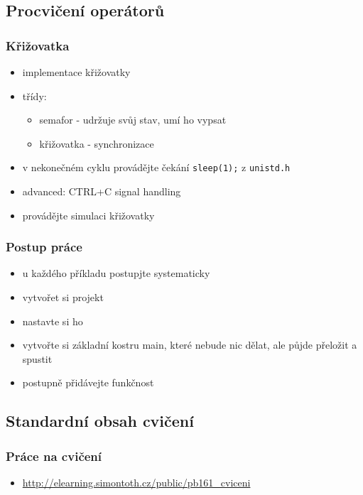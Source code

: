 \subsection{Procvičení operátorů}

\begin{frame}
	\frametitle{Křižovatka}
	\begin{itemize}
		\item{implementace křižovatky}
		\item{třídy:}
		\begin{itemize}
			\item{semafor - udržuje svůj stav, umí ho vypsat}
			\item{křižovatka - synchronizace}
		\end{itemize}
		\item{v nekonečném cyklu provádějte čekání \texttt{sleep(1);} z \texttt{unistd.h}}
		\item{advanced: CTRL+C signal handling}
		\item{provádějte simulaci křižovatky}
	\end{itemize}
\end{frame}

\begin{frame}
	\frametitle{Postup práce}
	\begin{itemize}
		\item{u každého příkladu postupjte systematicky}
		\item{vytvořet si projekt}
		\item{nastavte si ho}
		\item{vytvořte si základní kostru main, které nebude nic dělat, ale půjde přeložit a spustit}
		\item{postupně přidávejte funkčnost}
	\end{itemize}
\end{frame}

\subsection{Standardní obsah cvičení}

\begin{frame}
	\frametitle{Práce na cvičení}
	\begin{itemize}
		\item{\href{http://elearning.simontoth.cz/public/pb161\_cviceni}{http://elearning.simontoth.cz/public/pb161\_cviceni}}
	\end{itemize}
\end{frame}




